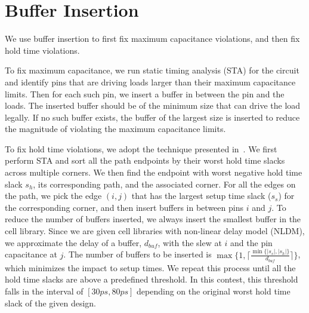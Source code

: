 \section{Buffer Insertion}
\label{sec:buf_insert}
We use buffer insertion to first fix maximum capacitance violations, and then fix hold time violations.

To fix maximum capacitance, we run static timing analysis (STA) for the circuit and identify pins that are driving loads larger than their maximum capacitance limits. Then for each such pin, we insert a buffer in between the pin and the loads. The inserted buffer should be of the minimum size that can drive the load legally. If no such buffer exists, the buffer of the largest size is inserted to reduce the magnitude of violating the maximum capacitance limits.

To fix hold time violations, we adopt the technique presented in~\cite{Shenoy:Minimum}. We first perform STA and sort all the path endpoints by their worst hold time slacks across multiple corners. We then find the endpoint with worst negative hold time slack $s_h$, its corresponding path, and the associated corner. For all the edges on the path, we pick the edge $(i, j)$ that has the largest setup time slack ($s_s$) for the corresponding corner, and then insert buffers in between pins $i$ and $j$. To reduce the number of buffers inserted, we always insert the smallest buffer in the cell library. Since we are given cell libraries with non-linear delay model (NLDM), we approximate the delay of a buffer, $d_{buf}$, with the slew at $i$ and the pin capacitance at $j$. The number of buffers to be inserted is $\max\{1, \lceil\frac{\min\{|s_s|, |s_h|\}}{d_{buf}}\rceil\}$, which minimizes the impact to setup times. We repeat this process until all the hold time slacks are above a predefined threshold. In this contest, this threshold falls in the interval of $[30ps, 80ps]$ depending on the original worst hold time slack of the given design.





